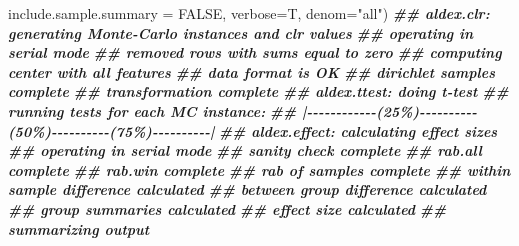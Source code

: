 \documentclass[
]{article}
\newenvironment{Shaded}{\begin{snugshade}}{\end{snugshade}}
\newcommand{\AttributeTok}[1]{\textcolor[rgb]{0.13,0.29,0.53}{#1}}
\newcommand{\ConstantTok}[1]{\textcolor[rgb]{0.56,0.35,0.01}{#1}}
\newcommand{\DocumentationTok}[1]{\textcolor[rgb]{0.56,0.35,0.01}{\textbf{\textit{#1}}}}
\newcommand{\NormalTok}[1]{#1}
\newcommand{\StringTok}[1]{\textcolor[rgb]{0.31,0.60,0.02}{#1}}
\begin{document}
\begin{Shaded}
\begin{Highlighting}[]
                       \AttributeTok{include.sample.summary =} \ConstantTok{FALSE}\NormalTok{, }\AttributeTok{verbose=}\NormalTok{T, }\AttributeTok{denom=}\StringTok{"all"}\NormalTok{)}
\DocumentationTok{\#\# aldex.clr: generating Monte{-}Carlo instances and clr values}
\DocumentationTok{\#\# operating in serial mode}
\DocumentationTok{\#\# removed rows with sums equal to zero}
\DocumentationTok{\#\# computing center with all features}
\DocumentationTok{\#\# data format is OK}
\DocumentationTok{\#\# dirichlet samples complete}
\DocumentationTok{\#\# transformation complete}
\DocumentationTok{\#\# aldex.ttest: doing t{-}test}
\DocumentationTok{\#\# running tests for each MC instance:}
\DocumentationTok{\#\# |{-}{-}{-}{-}{-}{-}{-}{-}{-}{-}{-}{-}(25\%){-}{-}{-}{-}{-}{-}{-}{-}{-}{-}(50\%){-}{-}{-}{-}{-}{-}{-}{-}{-}{-}(75\%){-}{-}{-}{-}{-}{-}{-}{-}{-}{-}|}
\DocumentationTok{\#\# aldex.effect: calculating effect sizes}
\DocumentationTok{\#\# operating in serial mode}
\DocumentationTok{\#\# sanity check complete}
\DocumentationTok{\#\# rab.all  complete}
\DocumentationTok{\#\# rab.win  complete}
\DocumentationTok{\#\# rab of samples complete}
\DocumentationTok{\#\# within sample difference calculated}
\DocumentationTok{\#\# between group difference calculated}
\DocumentationTok{\#\# group summaries calculated}
\DocumentationTok{\#\# effect size calculated}
\DocumentationTok{\#\# summarizing output}


\end{Highlighting}
\end{Shaded}
\end{document}
